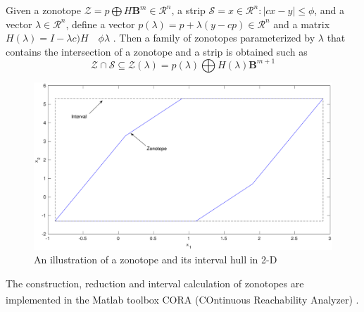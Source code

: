 \begin{lemma}\label{prop:intersect} \cite{Alamo2005}
Given a zonotope $\mathcal{Z} = p \bigoplus H\textbf{B}^m \in \mathcal{R}^n$,
 a strip $\mathscr{S} = {x \in \mathcal{R}^n : |cx-y| \leq \phi}$, 
 and a vector $\lambda \in \mathcal{R}^n$, 
 define a vector $p(\lambda) = p + \lambda(y - cp) \in \mathcal{R}^n$ 
 and a matrix $H(\lambda) = I - \lambda c)H \quad \phi \lambda$ . Then a family of zonotopes parameterized by $\lambda$ that contains the intersection of a zonotope and a strip is obtained such as
\begin{equation}
\mathcal{Z} \cap \mathscr{S} \subseteq \mathcal{Z}(\lambda) =  p(\lambda) \bigoplus H(\lambda) \textbf{B}^{m+1}
\end{equation} 
\end{lemma}
\begin{figure}[!h]
\label{fig:zonotope}
\includegraphics[scale=.25]{figures/zonotope}
\caption{An illustration of a zonotope and its interval hull in 2-D}
\end{figure}
The construction, reduction and interval calculation of zonotopes are implemented in the Matlab\textsuperscript{\tiny\textregistered} toolbox CORA (COntinuous Reachability Analyzer) \cite{Althoff2018}.
